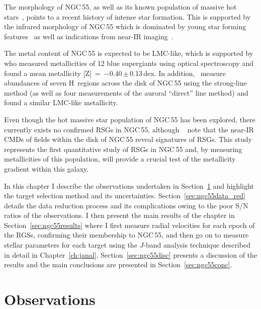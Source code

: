 The morphology of NGC\,55, as well as its known population of massive hot stars~\citep{2008A&A...485...41C,2012A&A...542A..79C}, points to a recent history of intense star formation.
This is supported by the infrared morphology of NGC\,55 which is dominated by young star forming features~\citep[][with a star formation rate of 0.22\,M$_{\odot}$yr$^{-1}$]{2004ApJS..154..248E} as well as indications from near-IR imaging~\citep{2005ApJ...622..279D}.

The metal content of NGC\,55 is expected to be LMC-like, which is supported by~\cite{2012A&A...542A..79C} who measured metallicities of 12 blue supergiants using optical spectroscopy and found a mean metallicity [Z]~=~$-$0.40\,$\pm$\,0.13\,dex.
In addition,~\cite{1983MNRAS.204..743W} measure abundances of seven H\,\2 regions across the disk of NGC\,55 using the strong-line method (as well as four measurements of the auroral ``direct'' line method) and found a similar LMC-like metallicity.

Even though the hot massive star population of NGC\,55 has been explored,
there currently exists no confirmed RSGs in NGC\,55, although ~\cite{2005ApJ...622..279D} note that the near-IR CMDs of fields within the disk of NGC\,55 reveal signatures of RSGs.
This study represents the first quantitative study of RSGs in NGC\,55 and, by measuring metallicities of this population, will provide a crucial test of the metallicity gradient within this galaxy.

In this chapter I describe the observations undertaken in Section~\ref{sec:ngc55obs} and highlight the target selection method and its uncertainties.
Section~\ref{sec:ngc55data_red} details the data reduction process and its complications owing to the poor S/N ratios of the observations.
I then present the main results of the chapter in Section~\ref{sec:ngc55results} where I first measure radial velocities for each epoch of the RGSs, confirming their membership to NGC\,55, and then go on to measure stellar parameters for each target using the $J$-band analysis technique described in detail in Chapter~\ref{ch:janal}.
Section~\ref{sec:ngc55disc} presents a discussion of the results and the main conclusions are presented in Section~\ref{sec:ngc55conc}.


\section{Observations} %
\label{sec:ngc55obs}

